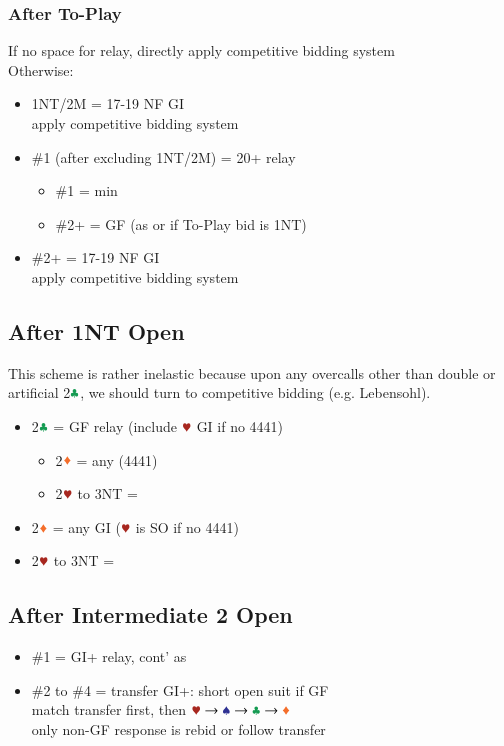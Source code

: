 \documentclass{article}
\begin{document}
\begin{multicols}{2}
\begin{CJK*}{UTF8}{gt}
\subsubsection{After To-Play}
If no space for relay, directly apply competitive bidding system \\
Otherwise:
\begin{itemize}
    \item 1NT/2M = 17-19 NF GI \\
        apply competitive bidding system
    \item \#1 (after excluding 1NT/2M) = 20+ relay
        \begin{itemize}
            \item \#1 = min
            \item \#2+ = GF (as  or
                 if To-Play bid is 1NT)
        \end{itemize}
    \item \#2+ = 17-19 NF GI \\
        apply competitive bidding system
\end{itemize}

\subsection{After 1NT Open}\label{sec:1n}
This scheme is rather inelastic because upon any overcalls other than double or artificial 2$\ccc$, we should turn to competitive bidding (e.g. Lebensohl).

\begin{itemize}
    \item 2$\ccc$ = GF relay (include $\hhh$ GI if no 4441)
    \begin{itemize}
        \item 2$\ddd$ = any (4441)
        \item 2$\hhh$ to 3NT = 
    \end{itemize}
    \item 2$\ddd$ = any GI ($\hhh$ is SO if no 4441)
    \item 2$\hhh$ to 3NT = 
\end{itemize}

\subsection{After Intermediate 2 Open}\label{sec:intermediate-2}
\begin{itemize}
    \item \#1 = GI+ relay, cont' as 
    \item \#2 to \#4 = transfer GI+: short open suit if GF \\
        match transfer first, then $\hscd$ \\
        only non-GF response is rebid or follow transfer
        

\end{itemize}
\end{CJK*}
\end{multicols}
\end{document}
